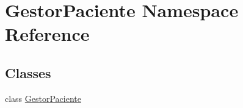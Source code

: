 \hypertarget{namespace_gestor_paciente}{}\section{Gestor\+Paciente Namespace Reference}
\label{namespace_gestor_paciente}
\subsection*{Classes}
\begin{DoxyCompactItemize}
\item 
class \mbox{\hyperlink{class_gestor_paciente_1_1_gestor_paciente}{Gestor\+Paciente}}
\end{DoxyCompactItemize}
